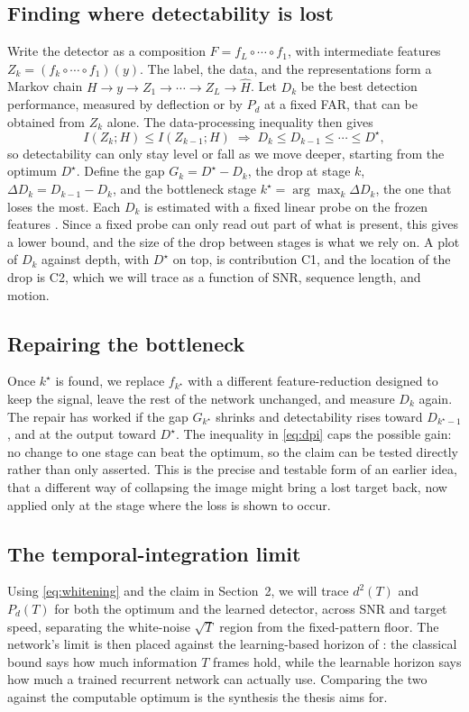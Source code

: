 \documentclass[11pt]{article}
\begin{document}
\subsection{Finding where detectability is lost}
Write the detector as a composition $F = f_L\circ\cdots\circ f_1$, with
intermediate features $Z_k = (f_k\circ\cdots\circ f_1)(y)$. The label, the data,
and the representations form a Markov chain
$H \to y \to Z_1 \to \cdots \to Z_L \to \hat{H}$. Let $D_k$ be the best detection
performance, measured by deflection or by $P_d$ at a fixed FAR, that can be
obtained from $Z_k$ alone. The data-processing inequality then gives
\begin{equation}
I(Z_k;H) \le I(Z_{k-1};H) \;\Rightarrow\; D_k \le D_{k-1} \le \cdots \le D^\star,
\label{eq:dpi}
\end{equation}
so detectability can only stay level or fall as we move deeper, starting from the
optimum $D^\star$. Define the gap $G_k = D^\star - D_k$, the drop at stage $k$,
$\Delta D_k = D_{k-1} - D_k$, and the bottleneck stage
$k^\star = \arg\max_k \Delta D_k$, the one that loses the most. Each $D_k$ is
estimated with a fixed linear probe on the frozen features \cite{alain}. Since a
fixed probe can only read out part of what is present, this gives a lower bound,
and the size of the drop between stages is what we rely on. A plot of $D_k$
against depth, with $D^\star$ on top, is contribution C1, and the location of the
drop is C2, which we will trace as a function of SNR, sequence length, and motion.

\subsection{Repairing the bottleneck}
Once $k^\star$ is found, we replace $f_{k^\star}$ with a different
feature-reduction designed to keep the signal, leave the rest of the network
unchanged, and measure $D_k$ again. The repair has worked if the gap
$G_{k^\star}$ shrinks and detectability rises toward $D_{k^\star-1}$, and at the
output toward $D^\star$. The inequality in \eqref{eq:dpi} caps the possible gain:
no change to one stage can beat the optimum, so the claim can be tested directly
rather than only asserted. This is the precise and testable form of an earlier
idea, that a different way of collapsing the image might bring a lost target
back, now applied only at the stage where the loss is shown to occur.

\subsection{The temporal-integration limit}
Using \eqref{eq:whitening} and the claim in Section~2, we will trace $d^2(T)$ and
$P_d(T)$ for both the optimum and the learned detector, across SNR and target
speed, separating the white-noise $\sqrt{T}$ region from the fixed-pattern floor.
The network's limit is then placed against the learning-based horizon of
\cite{livi}: the classical bound says how much information $T$ frames hold, while
the learnable horizon says how much a trained recurrent network can actually use.
Comparing the two against the computable optimum is the synthesis the thesis aims
for.
\end{document}
